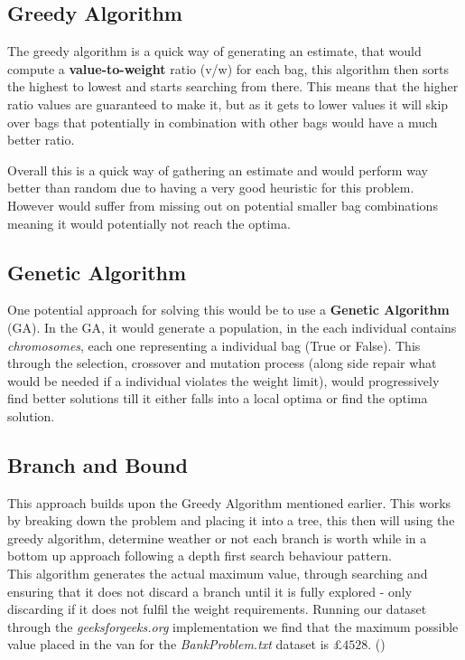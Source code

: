 \documentclass[11pt]{article}
\begin{document}
\subsection{Greedy Algorithm}

The greedy algorithm is a quick way of generating an estimate, that would compute a \textbf{value-to-weight} ratio (v/w) for each bag, this algorithm then sorts the highest to lowest and starts searching from there. This means that the higher ratio values are guaranteed to make it, but as it gets to lower values it will skip over bags that potentially in combination with other bags would have a much better ratio. 

Overall this is a quick way of gathering an estimate and would perform way better than random due to having a very good heuristic for this problem. However would suffer from missing out on potential smaller bag combinations meaning it would potentially not reach the optima.    

\subsection{Genetic Algorithm}

One potential approach for solving this would be to use a \textbf{Genetic Algorithm} (GA). In the GA, it would generate a population, in the each individual contains \textit{chromosomes}, each one representing a individual bag (True or False). This through the selection, crossover and mutation process (along side repair what would be needed if a individual violates the weight limit), would progressively find better solutions till it either falls into a local optima or find the optima solution.  

\subsection{Branch and Bound}
\label{branchandbund}

This approach builds upon the Greedy Algorithm mentioned earlier. This works by breaking down the problem and placing it into a tree, this then will using the greedy algorithm, determine weather or not each branch is worth while in a bottom up approach following a depth first search behaviour pattern. \\

\noindent This algorithm generates the actual maximum value, through searching and ensuring that it does not discard a branch until it is fully explored - only discarding if it does not fulfil the weight requirements. Running our dataset through the \textit{geeksforgeeks.org} implementation we find that the maximum possible value placed in the van for the \textit{BankProblem.txt} dataset is £$4528$. (\cite{branch_and_bond_2024})
\end{document}

